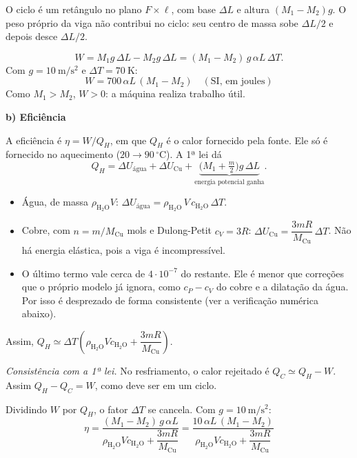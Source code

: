 \documentclass{article}%
\begin{document}
O ciclo é um retângulo no plano $F\times\ell$, com base $\Delta L$ e altura $(M_1-M_2)g$. O peso próprio da viga não contribui no ciclo: seu centro de massa sobe $\Delta L/2$ e depois desce $\Delta L/2$.

\[
W=M_1 g\,\Delta L-M_2 g\,\Delta L=(M_1-M_2)\,g\,\alpha L\,\Delta T .
\]
Com $g=10\ \mathrm{m/s^2}$ e $\Delta T=70\ \mathrm{K}$:
\[
\boxed{W=700\,\alpha L\,(M_1-M_2)\quad(\text{SI, em joules})}
\]
Como $M_1>M_2$, $W>0$: a máquina realiza trabalho útil.

\medskip
\textbf{b) Eficiência}

A eficiência é $\eta=W/Q_H$, em que $Q_H$ é o calor fornecido pela fonte. Ele só é fornecido no aquecimento ($20\to90\,^\circ\mathrm{C}$). A 1ª lei dá
\[
Q_H=\Delta U_{\text{água}}+\Delta U_{\text{Cu}}+\underbrace{\big(M_1+\tfrac m2\big)g\,\Delta L}_{\text{energia potencial ganha}} .
\]
\begin{itemize}
\item Água, de massa $\rho_{\mathrm{H_2O}}V$: $\Delta U_{\text{água}}=\rho_{\mathrm{H_2O}}\,V\,c_{\mathrm{H_2O}}\,\Delta T$.
\item Cobre, com $n=m/M_{\mathrm{Cu}}$ mols e Dulong-Petit $c_V=3R$: $\Delta U_{\text{Cu}}=\dfrac{3mR}{M_{\mathrm{Cu}}}\,\Delta T$. Não há energia elástica, pois a viga é incompressível.
\item O último termo vale cerca de $4\cdot10^{-7}$ do restante. Ele é menor que correções que o próprio modelo já ignora, como $c_P-c_V$ do cobre e a dilatação da água. Por isso é desprezado de forma consistente (ver a verificação numérica abaixo).
\end{itemize}
Assim, $Q_H\simeq\Delta T\left(\rho_{\mathrm{H_2O}}Vc_{\mathrm{H_2O}}+\dfrac{3mR}{M_{\mathrm{Cu}}}\right)$.

\emph{Consistência com a 1ª lei.} No resfriamento, o calor rejeitado é $Q_C\simeq Q_H-W$. Assim $Q_H-Q_C=W$, como deve ser em um ciclo.

Dividindo $W$ por $Q_H$, o fator $\Delta T$ se cancela. Com $g=10\ \mathrm{m/s^2}$:
\[
\boxed{\eta=\frac{(M_1-M_2)\,g\,\alpha L}{\rho_{\mathrm{H_2O}}V c_{\mathrm{H_2O}}+\dfrac{3mR}{M_{\mathrm{Cu}}}}=\frac{10\,\alpha L\,(M_1-M_2)}{\rho_{\mathrm{H_2O}}V c_{\mathrm{H_2O}}+\dfrac{3mR}{M_{\mathrm{Cu}}}}}
\]
\end{document}

